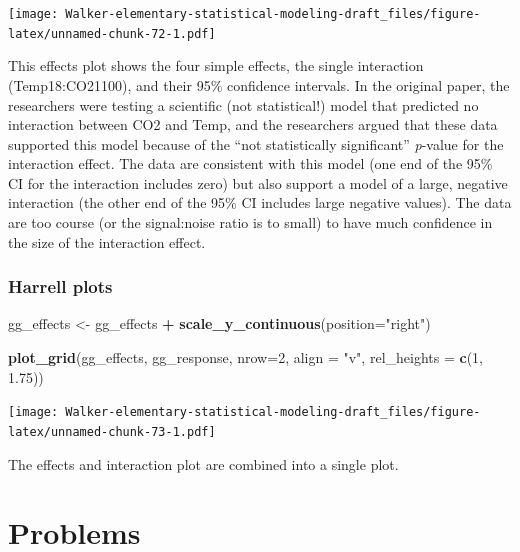 \documentclass[]{book}
\newenvironment{Shaded}{\begin{snugshade}}{\end{snugshade}}
\newcommand{\KeywordTok}[1]{\textcolor[rgb]{0.13,0.29,0.53}{\textbf{#1}}}
\newcommand{\DataTypeTok}[1]{\textcolor[rgb]{0.13,0.29,0.53}{#1}}
\newcommand{\DecValTok}[1]{\textcolor[rgb]{0.00,0.00,0.81}{#1}}
\newcommand{\FloatTok}[1]{\textcolor[rgb]{0.00,0.00,0.81}{#1}}
\newcommand{\StringTok}[1]{\textcolor[rgb]{0.31,0.60,0.02}{#1}}
\newcommand{\OperatorTok}[1]{\textcolor[rgb]{0.81,0.36,0.00}{\textbf{#1}}}
\newcommand{\NormalTok}[1]{#1}
\begin{document}
\texttt{[image: Walker-elementary-statistical-modeling-draft\_files/figure-latex/unnamed-chunk-72-1.pdf]}

This effects plot shows the four simple effects, the single interaction
(Temp18:CO21100), and their 95\% confidence intervals. In the original
paper, the researchers were testing a scientific (not statistical!)
model that predicted no interaction between CO2 and Temp, and the
researchers argued that these data supported this model because of the
``not statistically significant'' \emph{p}-value for the interaction
effect. The data are consistent with this model (one end of the 95\% CI
for the interaction includes zero) but also support a model of a large,
negative interaction (the other end of the 95\% CI includes large
negative values). The data are too course (or the signal:noise ratio is
to small) to have much confidence in the size of the interaction effect.

\subsubsection{Harrell plots}\label{harrell-plots}

\begin{Shaded}
\begin{Highlighting}[]
\NormalTok{gg_effects <-}\StringTok{ }\NormalTok{gg_effects }\OperatorTok{+}\StringTok{ }\KeywordTok{scale_y_continuous}\NormalTok{(}\DataTypeTok{position=}\StringTok{"right"}\NormalTok{)}

\KeywordTok{plot_grid}\NormalTok{(gg_effects, gg_response, }\DataTypeTok{nrow=}\DecValTok{2}\NormalTok{, }
          \DataTypeTok{align =} \StringTok{"v"}\NormalTok{, }
          \DataTypeTok{rel_heights =} \KeywordTok{c}\NormalTok{(}\DecValTok{1}\NormalTok{, }\FloatTok{1.75}\NormalTok{))}
\end{Highlighting}
\end{Shaded}

\texttt{[image: Walker-elementary-statistical-modeling-draft\_files/figure-latex/unnamed-chunk-73-1.pdf]}

The effects and interaction plot are combined into a single plot.

\section{Problems}\label{problems-3}
\end{document}
